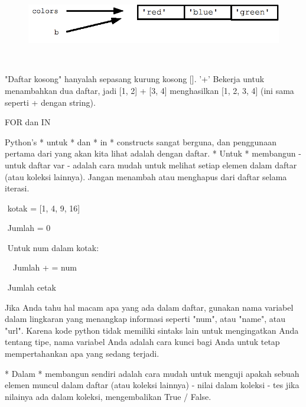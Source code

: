 \documentclass[a4paper,12pt]{report}
\begin{document}
\begin{figure}[H]
\begin{center}
\includegraphics[width=6.27in,height=0.96in]{./uploads_new/LISTS.docx_DIR/media/image2.png}
\end{center}
\end{figure}




{\fontsize{14pt}{14pt}\selectfont  \\}\vspace{14pt}
\noindent 
"Daftar kosong" hanyalah sepasang kurung kosong []. '+' Bekerja untuk menambahkan dua daftar, jadi [1, 2] + [3, 4] menghasilkan [1, 2, 3, 4] (ini sama seperti + dengan string). \par
\noindent 
FOR dan IN \par
\vspace{12pt}
\noindent 
Python's * untuk * dan * in * constructs sangat berguna, dan penggunaan pertama dari yang akan kita lihat adalah dengan daftar. * Untuk * membangun - untuk daftar var - adalah cara mudah untuk melihat setiap elemen dalam daftar (atau koleksi lainnya). Jangan menambah atau menghapus dari daftar selama iterasi. \par
\vspace{12pt}
\noindent 
 $  $ $  $kotak = [1, 4, 9, 16] \par
\noindent 
 $  $ $  $Jumlah = 0 \par
\noindent 
 $  $ $  $Untuk num dalam kotak: \par
\noindent 
 $  $ $  $ $  $ $  $Jumlah + = num \par
\noindent 
 $  $ $  $Jumlah cetak \par
\vspace{14pt}
\noindent 
Jika Anda tahu hal macam apa yang ada dalam daftar, gunakan nama variabel dalam lingkaran yang menangkap informasi seperti "num", atau "name", atau "url". Karena kode python tidak memiliki sintaks lain untuk mengingatkan Anda tentang tipe, nama variabel Anda adalah cara kunci bagi Anda untuk tetap mempertahankan apa yang sedang terjadi. \par
\vspace{12pt}
\noindent 
* Dalam * membangun sendiri adalah cara mudah untuk menguji apakah sebuah elemen muncul dalam daftar (atau koleksi lainnya) - nilai dalam koleksi - tes jika nilainya ada dalam koleksi, mengembalikan True / False. \par
\end{document}
